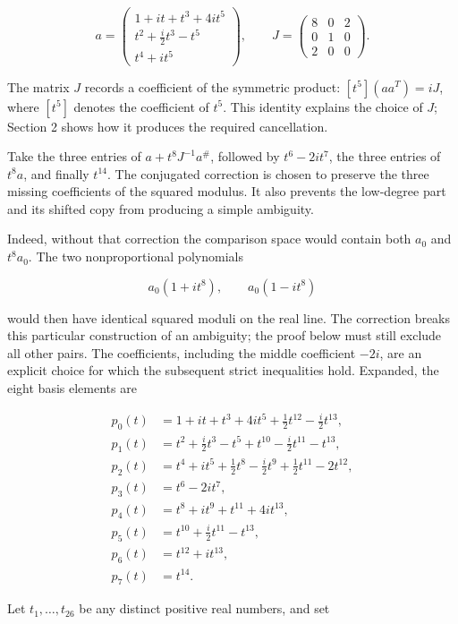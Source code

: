 \[
a=\begin{pmatrix}1+it+t^3+4it^5\\t^2+\tfrac i2t^3-t^5\\t^4+it^5\end{pmatrix},
\qquad
J=\begin{pmatrix}8&0&2\\0&1&0\\2&0&0\end{pmatrix}.
\]

The matrix \(J\) records a coefficient of the symmetric product:
\([t^5](aa^T)=iJ\), where \([t^5]\) denotes the coefficient of \(t^5\).
This identity explains the choice of \(J\); Section 2 shows how it
produces the required cancellation.

Take the three entries of \(a+t^8J^{-1}a^\#\), followed by
\(t^6-2it^7\), the three entries of \(t^8a\), and finally \(t^{14}\).
The conjugated correction is chosen to preserve the three missing
coefficients of the squared modulus. It also prevents the low-degree
part and its shifted copy from producing a simple ambiguity.

Indeed, without that correction the comparison space would contain both
\(a_0\) and \(t^8a_0\). The two nonproportional polynomials

\[
a_0(1+it^8),\qquad a_0(1-it^8)
\]

would then have identical squared moduli on the real line. The
correction breaks this particular construction of an ambiguity; the
proof below must still exclude all other pairs. The coefficients,
including the middle coefficient \(-2i\), are an explicit choice for
which the subsequent strict inequalities hold. Expanded, the eight basis
elements are

\[
\begin{aligned}
p_0(t)&=1+it+t^3+4it^5+\tfrac12t^{12}-\tfrac i2t^{13},\\
p_1(t)&=t^2+\tfrac i2t^3-t^5+t^{10}-\tfrac i2t^{11}-t^{13},\\
p_2(t)&=t^4+it^5+\tfrac12t^8-\tfrac i2t^9+\tfrac12t^{11}-2t^{12},\\
p_3(t)&=t^6-2it^7,\\
p_4(t)&=t^8+it^9+t^{11}+4it^{13},\\
p_5(t)&=t^{10}+\tfrac i2t^{11}-t^{13},\\
p_6(t)&=t^{12}+it^{13},\\
p_7(t)&=t^{14}.
\end{aligned}
\tag{1}
\]

Let \(t_1,\ldots,t_{26}\) be any distinct positive real numbers, and set

